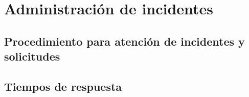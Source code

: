 \section{Administraci\'on de incidentes}

\subsection{Procedimiento para atenci\'on de incidentes y solicitudes}

\subsection{Tiempos de respuesta}


